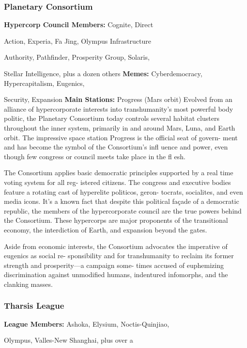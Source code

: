 \subsubsection{Planetary Consortium}

\textbf{Hypercorp Council Members:} Cognite, Direct 

Action, Experia, Fa Jing, Olympus Infrastructure 

Authority, Pathfinder, Prosperity Group, Solaris, 

Stellar Intelligence, plus a dozen others
\textbf{Memes:} Cyberdemocracy, Hypercapitalism, Eugenics, 

Security, Expansion
\textbf{Main Stations:} Progress (Mars orbit)
Evolved from an alliance of hypercorporate interests 
into transhumanity's most powerful body politic, the 
Planetary Consortium today controls several habitat 
clusters throughout the inner system, primarily in and 
around Mars, Luna, and Earth orbit. The impressive 
space station Progress is the official seat of govern-
ment and has become the symbol of the Consortium's 
infl uence and power, even though few congress or 
council meets take place in the fl esh.

The Consortium applies basic democratic principles 
supported by a real time voting system for all reg-
istered citizens. The congress and executive bodies 
feature a rotating cast of hyperelite politicos, geron-
tocrats, socialites, and even media icons. It's a known 
fact that despite this political façade of a democratic 
republic, the members of the hypercorporate council 
are the true powers behind the Consortium. These 
hypercorps are major proponents of the transitional 
economy, the interdiction of Earth, and expansion 
beyond the gates.

Aside from economic interests, the Consortium 
advocates the imperative of eugenics as social re-
sponsibility and for transhumanity to reclaim its 
former strength and prosperity—a campaign some-
times accused of euphemizing discrimination against 
unmodified humans, indentured infomorphs, and the 
clanking masses.

\subsubsection{Tharsis League}

\textbf{League Members:} Ashoka, Elysium, Noctis-Quinjiao, 

Olympus, Valles-New Shanghai, plus over a 

